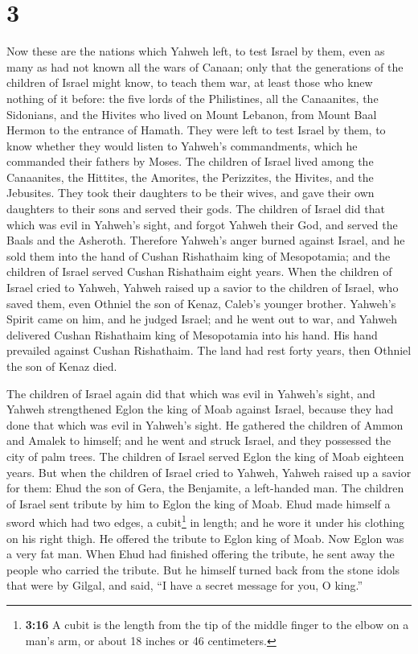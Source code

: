 \hypertarget{section-2}{%
\section{3}\label{section-2}}

 Now these are the nations which Yahweh left, to test
Israel by them, even as many as had not known all the wars of Canaan;
 only that the generations of the children of Israel might
know, to teach them war, at least those who knew nothing of it before:
 the five lords of the Philistines, all the Canaanites,
the Sidonians, and the Hivites who lived on Mount Lebanon, from Mount
Baal Hermon to the entrance of Hamath.  They were left to
test Israel by them, to know whether they would listen to Yahweh's
commandments, which he commanded their fathers by Moses. 
The children of Israel lived among the Canaanites, the Hittites, the
Amorites, the Perizzites, the Hivites, and the Jebusites. 
They took their daughters to be their wives, and gave their own
daughters to their sons and served their gods.  The
children of Israel did that which was evil in Yahweh's sight, and forgot
Yahweh their God, and served the Baals and the Asheroth. 
Therefore Yahweh's anger burned against Israel, and he sold them into
the hand of Cushan Rishathaim king of Mesopotamia; and the children of
Israel served Cushan Rishathaim eight years.  When the
children of Israel cried to Yahweh, Yahweh raised up a savior to the
children of Israel, who saved them, even Othniel the son of Kenaz,
Caleb's younger brother.  Yahweh's Spirit came on him,
and he judged Israel; and he went out to war, and Yahweh delivered
Cushan Rishathaim king of Mesopotamia into his hand. His hand prevailed
against Cushan Rishathaim.  The land had rest forty
years, then Othniel the son of Kenaz died.

 The children of Israel again did that which was evil in
Yahweh's sight, and Yahweh strengthened Eglon the king of Moab against
Israel, because they had done that which was evil in Yahweh's sight.
 He gathered the children of Ammon and Amalek to himself;
and he went and struck Israel, and they possessed the city of palm
trees.  The children of Israel served Eglon the king of
Moab eighteen years.  But when the children of Israel
cried to Yahweh, Yahweh raised up a savior for them: Ehud the son of
Gera, the Benjamite, a left-handed man. The children of Israel sent
tribute by him to Eglon the king of Moab.  Ehud made
himself a sword which had two edges, a cubit\footnote{\textbf{3:16} A
  cubit is the length from the tip of the middle finger to the elbow on
  a man's arm, or about 18 inches or 46 centimeters.} in length; and he
wore it under his clothing on his right thigh.  He
offered the tribute to Eglon king of Moab. Now Eglon was a very fat man.
 When Ehud had finished offering the tribute, he sent
away the people who carried the tribute.  But he himself
turned back from the stone idols that were by Gilgal, and said, ``I have
a secret message for you, O king.''

